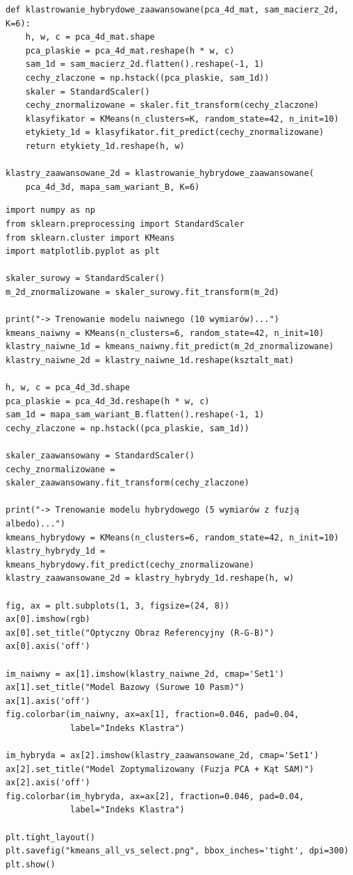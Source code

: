 \documentclass[12pt,a4paper]{article}
\begin{document}
\begin{lstlisting}[caption={Model rozszerzony: PC1--PC4 oraz SAM.},label={lst:kmeans-advanced}]
def klastrowanie_hybrydowe_zaawansowane(pca_4d_mat, sam_macierz_2d, K=6):
    h, w, c = pca_4d_mat.shape
    pca_plaskie = pca_4d_mat.reshape(h * w, c)
    sam_1d = sam_macierz_2d.flatten().reshape(-1, 1)
    cechy_zlaczone = np.hstack((pca_plaskie, sam_1d))
    skaler = StandardScaler()
    cechy_znormalizowane = skaler.fit_transform(cechy_zlaczone)
    klasyfikator = KMeans(n_clusters=K, random_state=42, n_init=10)
    etykiety_1d = klasyfikator.fit_predict(cechy_znormalizowane)
    return etykiety_1d.reshape(h, w)

klastry_zaawansowane_2d = klastrowanie_hybrydowe_zaawansowane(
    pca_4d_3d, mapa_sam_wariant_B, K=6)
\end{lstlisting}

\begin{lstlisting}[caption={Porównanie modelu bazowego i hybrydowego.},label={lst:ablation}]
import numpy as np
from sklearn.preprocessing import StandardScaler
from sklearn.cluster import KMeans
import matplotlib.pyplot as plt

skaler_surowy = StandardScaler()
m_2d_znormalizowane = skaler_surowy.fit_transform(m_2d)

print("-> Trenowanie modelu naiwnego (10 wymiarów)...")
kmeans_naiwny = KMeans(n_clusters=6, random_state=42, n_init=10)
klastry_naiwne_1d = kmeans_naiwny.fit_predict(m_2d_znormalizowane)
klastry_naiwne_2d = klastry_naiwne_1d.reshape(ksztalt_mat)

h, w, c = pca_4d_3d.shape
pca_plaskie = pca_4d_3d.reshape(h * w, c)
sam_1d = mapa_sam_wariant_B.flatten().reshape(-1, 1)
cechy_zlaczone = np.hstack((pca_plaskie, sam_1d))

skaler_zaawansowany = StandardScaler()
cechy_znormalizowane = skaler_zaawansowany.fit_transform(cechy_zlaczone)

print("-> Trenowanie modelu hybrydowego (5 wymiarów z fuzją albedo)...")
kmeans_hybrydowy = KMeans(n_clusters=6, random_state=42, n_init=10)
klastry_hybrydy_1d = kmeans_hybrydowy.fit_predict(cechy_znormalizowane)
klastry_zaawansowane_2d = klastry_hybrydy_1d.reshape(h, w)

fig, ax = plt.subplots(1, 3, figsize=(24, 8))
ax[0].imshow(rgb)
ax[0].set_title("Optyczny Obraz Referencyjny (R-G-B)")
ax[0].axis('off')

im_naiwny = ax[1].imshow(klastry_naiwne_2d, cmap='Set1')
ax[1].set_title("Model Bazowy (Surowe 10 Pasm)")
ax[1].axis('off')
fig.colorbar(im_naiwny, ax=ax[1], fraction=0.046, pad=0.04,
             label="Indeks Klastra")

im_hybryda = ax[2].imshow(klastry_zaawansowane_2d, cmap='Set1')
ax[2].set_title("Model Zoptymalizowany (Fuzja PCA + Kąt SAM)")
ax[2].axis('off')
fig.colorbar(im_hybryda, ax=ax[2], fraction=0.046, pad=0.04,
             label="Indeks Klastra")

plt.tight_layout()
plt.savefig("kmeans_all_vs_select.png", bbox_inches='tight', dpi=300)
plt.show()
\end{lstlisting}
\end{document}
